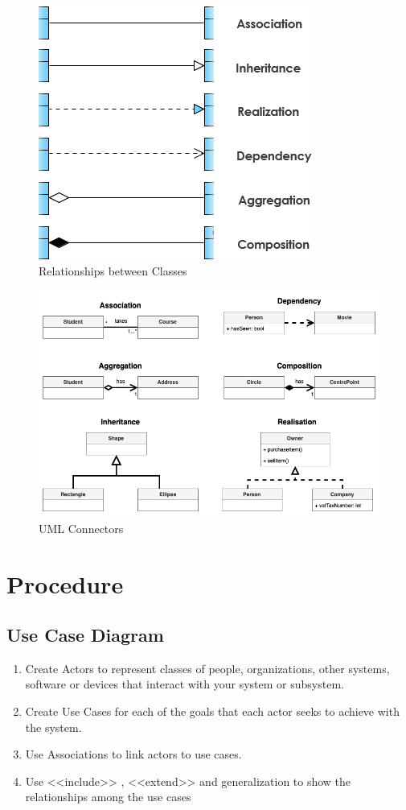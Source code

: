 \documentclass[11pt]{article}
\begin{document}
\begin{figure}[H]
	\centering
	\includegraphics[scale=0.7]{07-relationships-between-classes.png}
	\caption{Relationships between Classes}
\end{figure}

\begin{figure}[H]
	\centering
	\includegraphics[scale=0.6]{uml-connectors.png}
	\caption{UML Connectors}
\end{figure}

\section{Procedure}

\subsection{Use Case Diagram}
\begin{enumerate}
	\item Create Actors to represent classes of people, organizations, other systems, software or
	      devices that interact with your system or subsystem.
	\item Create Use Cases for each of the goals that each actor seeks to achieve with the
	      system.
	\item Use Associations to link actors to use cases.
	\item Use <<include>> , <<extend>> and generalization to show the relationships among
	      the use cases
\end{enumerate}
\end{document}
